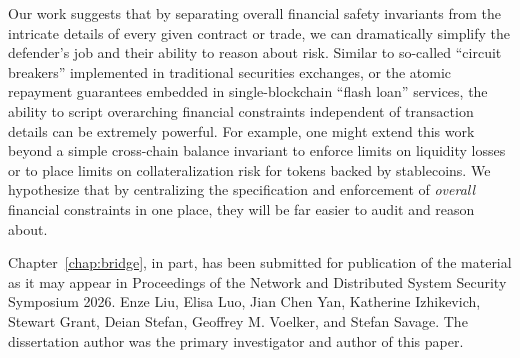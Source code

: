 Our work suggests that by separating overall financial safety
invariants from the intricate details of every given contract or
trade, we can dramatically simplify the defender's job and their
ability to reason about risk.  Similar to so-called ``circuit
breakers'' implemented in traditional securities exchanges, or the
atomic repayment guarantees embedded in single-blockchain ``flash
loan'' services, the ability to script overarching financial
constraints independent of transaction details can be extremely
powerful.  For example, one might extend this work beyond a simple
cross-chain balance invariant to enforce limits on liquidity losses or
to place limits on collateralization risk for tokens backed by
stablecoins.  We hypothesize that by centralizing the specification and
enforcement of \emph{overall} financial constraints in one place, they
will be far easier to audit and reason about.


Chapter~\ref{chap:bridge}, in part, has been submitted for publication of the material as it may appear in Proceedings of the Network and Distributed System Security Symposium 2026. Enze Liu, Elisa Luo, Jian Chen Yan, Katherine Izhikevich, Stewart Grant, Deian Stefan, Geoffrey M. Voelker, and Stefan Savage. The dissertation author was the primary investigator and author of this paper.


